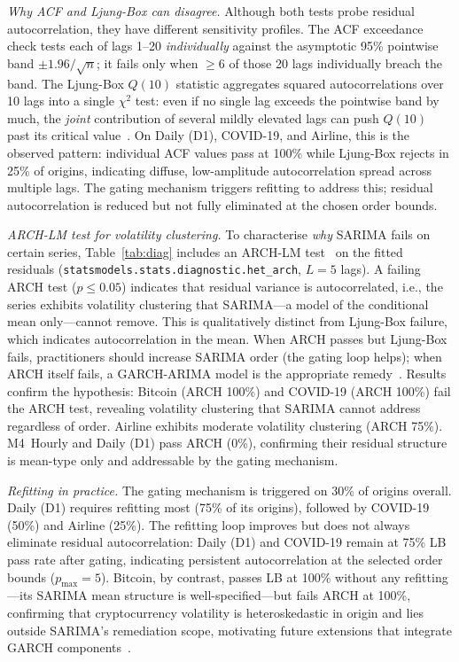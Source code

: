 \documentclass[sn-mathphys-num,pdflatex]{sn-jnl}
\begin{document}
\textit{Why ACF and Ljung-Box can disagree.}
Although both tests probe residual autocorrelation, they have
different sensitivity profiles.
The ACF exceedance check tests each of lags 1--20
\emph{individually} against the asymptotic 95\% pointwise band
$\pm 1.96/\sqrt{n}$; it fails only when $\geq 6$ of those 20 lags
individually breach the band.
The Ljung-Box $Q(10)$ statistic aggregates squared autocorrelations
over 10 lags into a single $\chi^2$ test: even if no single lag
exceeds the pointwise band by much, the \emph{joint} contribution
of several mildly elevated lags can push $Q(10)$ past its critical
value~\cite{ljungbox1978, hassani2020lb}.
On Daily (D1), COVID-19, and Airline, this is the observed pattern:
individual ACF values pass at 100\% while Ljung-Box rejects in 25\%
of origins, indicating diffuse, low-amplitude autocorrelation spread
across multiple lags. The gating mechanism triggers refitting to
address this; residual autocorrelation is reduced but not fully
eliminated at the chosen order bounds.

\textit{ARCH-LM test for volatility clustering.}
To characterise \emph{why} SARIMA fails on certain series,
Table~\ref{tab:diag} includes an ARCH-LM test~\cite{engle1982}
on the fitted residuals (\texttt{statsmodels.stats.diagnostic.het\_arch},
$L{=}5$ lags). A failing ARCH test ($p{\leq}0.05$)
indicates that residual variance is autocorrelated, i.e., the series
exhibits volatility clustering that SARIMA---a model of the conditional
mean only---cannot remove. This is qualitatively distinct from
Ljung-Box failure, which indicates autocorrelation in the mean.
When ARCH passes but Ljung-Box fails, practitioners should increase
SARIMA order (the gating loop helps); when ARCH itself fails,
a GARCH-ARIMA model is the appropriate remedy~\cite{bollerslev1986garch}.
Results confirm the hypothesis: Bitcoin (ARCH 100\%) and COVID-19
(ARCH 100\%) fail the ARCH test, revealing volatility clustering that
SARIMA cannot address regardless of order. Airline exhibits moderate
volatility clustering (ARCH 75\%). M4~Hourly and Daily (D1) pass
ARCH (0\%), confirming their residual structure is mean-type only
and addressable by the gating mechanism.

\textit{Refitting in practice.}
The gating mechanism is triggered on 30\% of origins overall.
Daily (D1) requires refitting most (75\% of its origins), followed
by COVID-19 (50\%) and Airline (25\%).
The refitting loop improves but does not always eliminate residual
autocorrelation: Daily (D1) and COVID-19 remain at 75\% LB pass rate
after gating, indicating persistent autocorrelation at the selected
order bounds ($p_{\max}{=}5$).
Bitcoin, by contrast, passes LB at 100\% without any refitting---its
SARIMA mean structure is well-specified---but fails ARCH at 100\%,
confirming that cryptocurrency volatility is heteroskedastic in origin
and lies outside SARIMA's remediation scope, motivating future
extensions that integrate GARCH components~\cite{bollerslev1986garch}.
\end{document}
